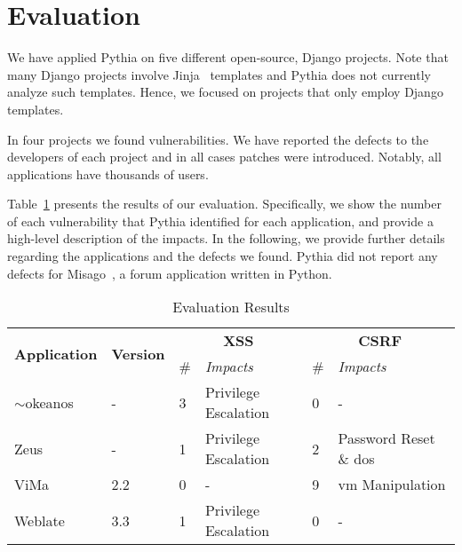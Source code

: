 \section{Evaluation}
\label{sec:eval}

We have applied Pythia on five
different open-source,
Django projects.
Note that many Django projects
involve Jinja~\cite{jinja} templates
and Pythia does not currently
analyze such templates.
Hence,
we focused on projects that only
employ Django templates.

In four projects we found vulnerabilities.
We have reported the defects to
the developers of each project and in
all cases patches were introduced.
Notably,
all applications have thousands of users.

Table~\ref{tabular:apps} presents the results
of our evaluation.
Specifically,
we show the number of each vulnerability
that Pythia identified for each application,
and provide a high-level
description of the impacts.
In the following,
we provide further details
regarding the applications and the defects we found.
Pythia did not report any defects for
Misago~\cite{misago},
a forum application written in Python.

\begin{center}
\begin{table}[b]
  \caption{Evaluation Results}
  \vspace{-3mm}
  \begin{tabular}{p{1.8cm}| l | lp{1.6cm}|lp{1.6cm}}
    \hline
     \multirow{2}{*}{\textbf{Application}} &
        \multirow{2}{*}{\textbf{Version}} &
        \multicolumn{2}{c|}{\textbf{XSS}} &
        \multicolumn{2}{c}{\textbf{CSRF}} \\ 
        & & {\#} &  {\it Impacts} & {\#}  & {\it Impacts} \\ \hline
        $\sim$okeanos & - & 3 & Privilege Escalation & 0 & - \\
        \hline
        Zeus & - & 1 & Privilege Escalation & 2 & Password Reset \& {\sc d}o{\sc s}  \\ \hline
        ViMa & 2.2 & 0 & - & 9 & {\sc vm} Manipulation \\ \hline
        Weblate & 3.3 & 1 & Privilege Escalation & 0 & - \\
    \hline
  \end{tabular}
  \label{tabular:apps}
\end{table}

\end{center}

